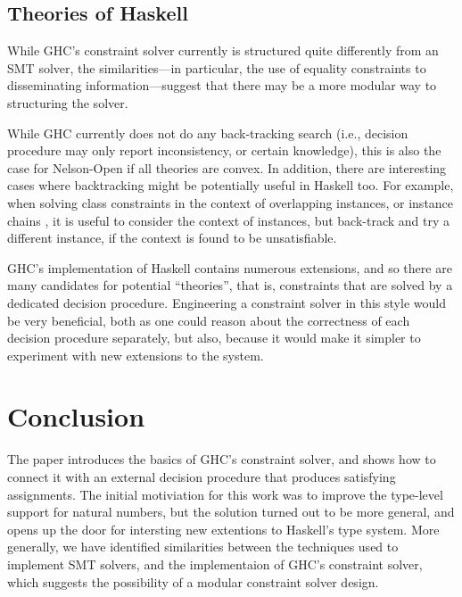 \documentclass{sigplanconf}
\begin{document}
\subsection{Theories of Haskell}

While GHC's constraint solver currently is structured quite differently
from an SMT solver, the similarities---in particular, the use of equality
constraints to disseminating information---suggest that there may be
a more modular way to structuring the solver.

While GHC currently does not do any back-tracking search (i.e., decision
procedure may only report inconsistency, or certain knowledge), this
is also the case for Nelson-Open if all theories are convex.  In addition,
there are interesting cases where backtracking might be potentially useful
in Haskell too.  For example, when solving class constraints in the
context of overlapping instances, or instance chains \cite{instance-chains},
it is useful to consider the context of instances,
but back-track and try a different instance, if the context is found
to be unsatisfiable.

GHC's implementation of Haskell contains numerous extensions, and so
there are many candidates for potential ``theories'', that is, constraints
that are solved by a dedicated decision procedure.  Engineering a
constraint solver in this style would be very beneficial, both
as one could reason about the correctness of each decision procedure
separately, but also, because it would make it simpler to experiment
with new extensions to the system.

\section {Conclusion}

The paper introduces the basics of GHC's constraint solver, and shows
how to connect it with an external decision procedure that produces
satisfying assignments.  The initial motiviation for this work was
to improve the type-level support for natural numbers, but the solution
turned out to be more general, and opens up the door for intersting
new extentions to Haskell's type system.  More generally, we have
identified similarities between the techniques used to implement SMT solvers,
and the implementaion of GHC's constraint solver, which suggests
the possibility of a modular constraint solver design.











% 
% 
% 
% 
\end{document}
